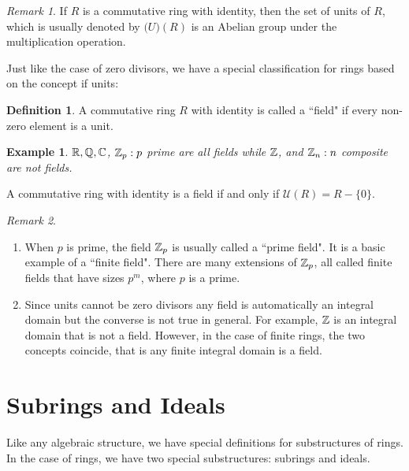 \documentclass[12pt]{article}
\theoremstyle{plain}
\newtheorem{example}{Example}
\theoremstyle{definition}
\newtheorem{definition}{Definition}
\theoremstyle{remark}
\newtheorem{remark}{Remark}
\begin{document}
\begin{remark}
If $R$ is a commutative ring with identity, then the set of units of $R$, which is usually denoted by $\mathcal(U)(R)$ is an Abelian group under the multiplication operation.  
\end{remark}

Just like the case of zero divisors, we have a special classification for rings based on the concept if units:
\begin{definition}
A commutative ring $R$ with identity is called a ``field" if every non-zero element is a unit.
\end{definition}
\begin{example}
$\mathbb{R}, \mathbb{Q}, \mathbb{C}$, $\mathbb{Z}_p:p$ prime are all fields while $\mathbb{Z}$, and $\mathbb{Z}_n:n$ composite are not fields. 
\end{example}
A commutative ring with identity is a field if and only if $\mathcal{U}(R) = R -\{0\}$. 
\begin{remark}
\begin{enumerate}
\item When $p$ is prime, the field $\mathbb{Z}_p$ is usually called a ``prime field". It is a basic example of a ``finite field". There are many extensions of $\mathbb{Z}_p$, all called finite fields that have sizes $p^m$, where $p$ is a prime. 

\item Since units cannot be zero divisors any field is automatically an integral domain but the converse is not true in general. For example, $\mathbb{Z}$ is an integral domain that is not a field. However, in the case of finite rings, the two concepts coincide, that is any finite integral domain is a field.
\end{enumerate}
\end{remark}
  
\section{Subrings and Ideals}
Like any algebraic structure, we have special definitions for substructures of rings. In the case of rings, we have two special substructures: subrings and ideals. 
\end{document}
